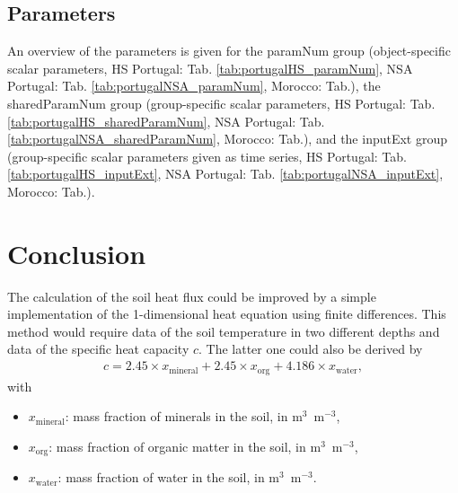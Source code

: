 \documentclass{scrreprt}
\newenvironment{denseitem}{
  \begin{itemize}
    \setlength{\itemsep}{0pt}
    \setlength{\parskip}{0pt}
    \setlength{\parsep}{0pt}
}{
  \end{itemize}
}
\begin{document}
\section{Parameters} \label{sec:results_par}

An overview of the parameters is given for the \textsf{paramNum} group (object-specific scalar parameters, HS Portugal: Tab. \ref{tab:portugalHS_paramNum}, NSA Portugal: Tab. \ref{tab:portugalNSA_paramNum}, Morocco: Tab.), the \textsf{sharedParamNum} group (group-specific scalar parameters, HS Portugal: Tab. \ref{tab:portugalHS_sharedParamNum}, NSA Portugal: Tab. \ref{tab:portugalNSA_sharedParamNum}, Morocco: Tab.), and the \textsf{inputExt} group (group-specific scalar parameters given as time series, HS Portugal: Tab. \ref{tab:portugalHS_inputExt}, NSA Portugal: Tab. \ref{tab:portugalNSA_inputExt}, Morocco: Tab.).














\chapter{Conclusion} \label{ch:conclusion}

The calculation of the soil heat flux could be improved by a simple implementation of the 1-dimensional heat equation using finite differences.
This method would require data of the soil temperature in two different depths and data of the specific heat capacity $c$.
The latter one could also be derived by
%
\begin{align*}
  c = 2.45 \times x_\text{mineral} + 2.45 \times x_\text{org} + 4.186 \times x_\text{water},
\end{align*}
%
with
\begin{denseitem}
  \item[] $x_\text{mineral}$: mass fraction of minerals in the soil, in m$^3$~m$^{-3}$,
  \item[] $x_\text{org}$: mass fraction of organic matter in the soil, in m$^3$~m$^{-3}$,
  \item[] $x_\text{water}$: mass fraction of water in the soil, in m$^3$~m$^{-3}$.
\end{denseitem}




\end{document}
